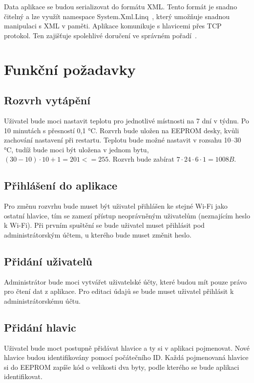 \documentclass[thesis=B,czech]{FITthesis}[2012/10/20]
\begin{document}
Data aplikace se budou serializovat do formátu XML. Tento formát je snadno čitelný a lze využít namespace System.Xml.Linq~\cite{linq}, který umožňuje snadnou manipulaci s XML v paměti.
\newline
\newline
\indent Aplikace komunikuje s hlavicemi přes TCP protokol. Ten zajišťuje spolehlivé doručení ve správném pořadí~\cite{tcp}.

\section{Funkční požadavky}

\subsection{Rozvrh vytápění}

Uživatel bude moci nastavit teplotu pro jednotlivé místnosti na 7 dní v týdnu. Po 10 minutách s přesností 0,1 °C. Rozvrh bude uložen na EEPROM desky, kvůli zachování nastavení při restartu. Teplotu bude možné nastavit v rozsahu 10–30 °C, tudíž bude moci být uložena v jednom bytu, $(30 - 10) \cdot 10 + 1 = 201 <= 255$. Rozvrh bude zabírat $7 \cdot 24 \cdot 6 \cdot 1 = 1008B$.

\subsection{Přihlášení do aplikace}

Pro změnu rozvrhu bude muset být uživatel přihlášen ke stejné Wi-Fi jako ostatní hlavice, tím se zamezí přístup neoprávněným uživatelům (neznajícím heslo k Wi-Fi). Při prvním spuštění se bude uživatel muset přihlásit pod administrátorským účtem, u kterého bude muset změnit heslo.

\subsection{Přidání uživatelů}

Administrátor bude moci vytvářet uživatelské účty, které budou mít pouze právo pro čtení dat z aplikace. Pro editaci údajů se bude muset uživatel přihlásit k administrátorskému účtu.

\subsection{Přidání hlavic}

Uživatel bude moct postupně přidávat hlavice a ty si v aplikaci pojmenovat. Nové hlavice budou identifikovány pomocí počátečního ID. Každá pojmenovaná hlavice si do EEPROM zapíše kód o velikosti dva byty, podle kterého se bude aplikaci identifikovat. 
\end{document}
